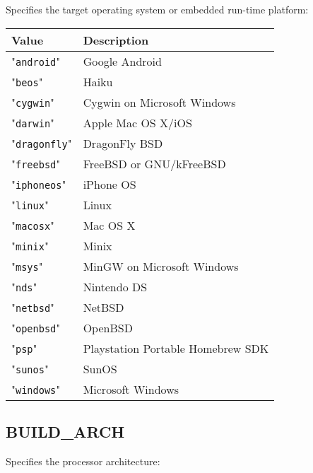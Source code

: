 \documentclass{article}
\newcommand{\val}[1]{"{\tt #1}"}
\begin{document}
Specifies the target operating system or embedded run-time platform:

\begin{tabular}{ll}
Value         & Description           \\
\hline
\val{android} & Google Android              \\
\val{beos}    & Haiku                       \\
\val{cygwin}  & Cygwin on Microsoft Windows \\
\val{darwin}  & Apple Mac OS X/iOS              \\
\val{dragonfly} & DragonFly BSD             \\
\val{freebsd} & FreeBSD or GNU/kFreeBSD \\
\val{iphoneos}& iPhone OS             \\
\val{linux}   & Linux                 \\
\val{macosx}  & Mac OS X              \\
\val{minix}   & Minix                 \\
\val{msys}    & MinGW  on Microsoft Windows \\
\val{nds}     & Nintendo DS           \\
\val{netbsd}  & NetBSD		      \\
\val{openbsd} & OpenBSD		      \\
\val{psp}     & Playstation Portable Homebrew SDK \\
\val{sunos}   & SunOS                 \\
\val{windows} & Microsoft Windows     \\
\end{tabular}

\subsection{BUILD\_ARCH}

Specifies the processor architecture:
\end{document}
